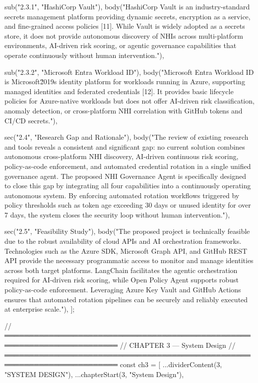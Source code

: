   sub("2.3.1", "HashiCorp Vault"),
  body("HashiCorp Vault is an industry-standard secrets management platform providing dynamic secrets, encryption as a service, and fine-grained access policies [11]. While Vault is widely adopted as a secrets store, it does not provide autonomous discovery of NHIs across multi-platform environments, AI-driven risk scoring, or agentic governance capabilities that operate continuously without human intervention."),

  sub("2.3.2", "Microsoft Entra Workload ID"),
  body("Microsoft Entra Workload ID is Microsoft\u2019s identity platform for workloads running in Azure, supporting managed identities and federated credentials [12]. It provides basic lifecycle policies for Azure-native workloads but does not offer AI-driven risk classification, anomaly detection, or cross-platform NHI correlation with GitHub tokens and CI/CD secrets."),

  sec("2.4", "Research Gap and Rationale"),
  body("The review of existing research and tools reveals a consistent and significant gap: no current solution combines autonomous cross-platform NHI discovery, AI-driven continuous risk scoring, policy-as-code enforcement, and automated credential rotation in a single unified governance agent. The proposed NHI Governance Agent is specifically designed to close this gap by integrating all four capabilities into a continuously operating autonomous system. By enforcing automated rotation workflows triggered by policy thresholds such as token age exceeding 30 days or unused identity for over 7 days, the system closes the security loop without human intervention."),

  sec("2.5", "Feasibility Study"),
  body("The proposed project is technically feasible due to the robust availability of cloud APIs and AI orchestration frameworks. Technologies such as the Azure SDK, Microsoft Graph API, and GitHub REST API provide the necessary programmatic access to monitor and manage identities across both target platforms. LangChain facilitates the agentic orchestration required for AI-driven risk scoring, while Open Policy Agent supports robust policy-as-code enforcement. Leveraging Azure Key Vault and GitHub Actions ensures that automated rotation pipelines can be securely and reliably executed at enterprise scale."),
];

// ═════════════════════════════════════════════════════════════════════════
//  CHAPTER 3 — System Design
// ═════════════════════════════════════════════════════════════════════════
const ch3 = [
  ...dividerContent(3, "SYSTEM DESIGN"),
  ...chapterStart(3, "System Design"),

